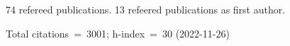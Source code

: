 74 refereed publications. 13 refeered publications as first author.

Total citations~=~3001; h-index~=~30 (2022-11-26)